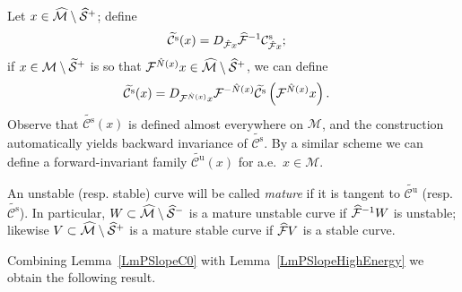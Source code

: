 \documentclass[AHL, Unicode, longabstracts,published]{cedram}
\newcommand{\inv}{^{-1}}
\newcommand{\unstable}{\text{u}}
\newcommand{\stable}{\text{s}}
\newcommand{\cm}{\mathcal{F}}
\newcommand{\csp}{\mathcal{M}}
\newcommand{\cmp}{\hat\cm}
\newcommand{\cone}{\mathcal{C}}
\newcommand{\cspi}{\widehat{\csp}}
\newcommand{\coneu}{\cone^\unstable}
\newcommand{\cones}{\cone^\stable}
\newcommand{\mconeu}{{\widetilde{\coneu}}}
\newcommand{\mcones}{{\widetilde{\cones}}}
\newcommand{\singPrivate}{\mathcal{S}}
\newcommand{\singp}[1]{\hat{\singPrivate}^{#1}}
\newcommand{\singt}[1]{\tilde{\singPrivate}^{#1}}
\newcommand{\Np}{\hat N}
\let\oldtilde\tilde
\renewcommand*{\tilde}[1]{\mathchoice{\widetilde{#1}}{\widetilde{#1}}{\oldtilde{#1}}{\oldtilde{#1}}}
\let\oldhat\hat
\renewcommand*{\hat}[1]{\mathchoice{\widehat{#1}}{\widehat{#1}}{\oldhat{#1}}{\oldhat{#1}}}
\begin{document}
\begin{defi}\label{def:mature-cones}
Let $x\in\cspi\setminus\singp+$; define
\begin{align*}
\mcones(x)&=D_{\cmp x}\cmp\inv\cones_{\cmp x};
\end{align*}
if $x\in\csp\setminus\singt+$ is so that $\cm^{\Np(x)}x\in\cspi\setminus\singp+$, we can define
\begin{align*}
\mcones(x) &= D_{\cm^{\Np(x)}x}\cm^{-\Np(x)}\mcones\left(\cm^{\Np(x)}x\right).
\end{align*}
Observe that $\mcones(x)$ is defined almost everywhere on $\csp$, and the construction automatically yields backward invariance of $\mcones$. By a similar scheme we can define a forward-invariant family $\mconeu(x)$ for a.e.\ $x\in\csp$.


An unstable (resp. stable) curve will be called \emph{mature} if it is tangent to $\mconeu$ (resp.~$\mcones$). In particular, $W\subset\cspi\setminus\singp-$ is a mature unstable curve if $\cmp^{-1} W$ is unstable; likewise $V\subset\cspi\setminus\singp+$ is a mature stable curve if $\cmp V$ is a stable curve.
\end{defi}

Combining Lemma~\ref{LmPSlopeC0} with Lemma~\ref{LmPSlopeHighEnergy} we obtain the following result.
\end{document}
